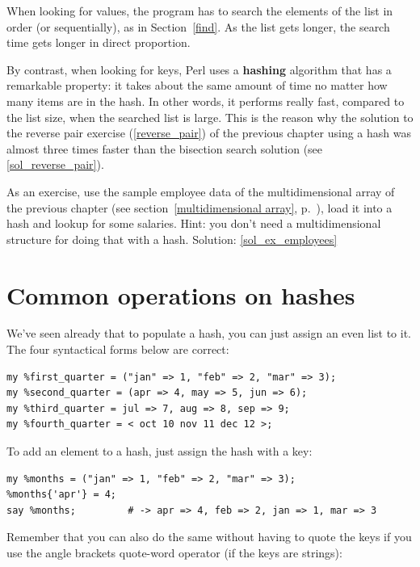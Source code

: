 When looking for values, the program has to search the 
elements of the list in order (or sequentially), as in 
Section~\ref{find}.  As the list gets longer, the search 
time gets longer in direct proportion.

By contrast, when looking for keys, Perl uses a {\bf hashing} 
algorithm that has a remarkable property: it takes about 
the same amount of time no matter how many items are in 
the hash. In other words, it performs really fast, compared 
to the list size, when the 
searched list is large. This is the reason why the solution to 
the reverse pair exercise (\ref{reverse_pair}) of the 
previous chapter using a hash was almost three times 
faster than the bisection search solution 
(see \ref{sol_reverse_pair}).

\label{ex_employees}
As an exercise, use the sample employee data of the 
multidimensional array of the previous chapter (see 
section~\ref{multidimensional array}, 
p.~\pageref{multidimensional array}), load it into a hash and 
lookup for some salaries. Hint: you don't need a 
multidimensional structure for doing that with a hash.
Solution: \ref{sol_ex_employees}


\section{Common operations on hashes}

We've seen already that to populate a hash, you can just 
assign an even list to it. The four syntactical forms 
below are correct:

\begin{verbatim}
my %first_quarter = ("jan" => 1, "feb" => 2, "mar" => 3);
my %second_quarter = (apr => 4, may => 5, jun => 6);
my %third_quarter = jul => 7, aug => 8, sep => 9;
my %fourth_quarter = < oct 10 nov 11 dec 12 >;
\end{verbatim}

To add an element to a hash, just assign the hash with a key:

\begin{verbatim}
my %months = ("jan" => 1, "feb" => 2, "mar" => 3);
%months{'apr'} = 4;
say %months;         # -> apr => 4, feb => 2, jan => 1, mar => 3
\end{verbatim}

Remember that you can also do the same without having to 
quote the keys if you use the angle brackets quote-word 
operator (if the keys are strings):

